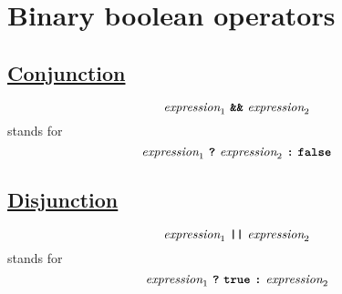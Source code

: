 \section*{Binary boolean operators}

\subsection*{\href{https://sicp.comp.nus.edu.sg/chapters/8}{Conjunction}}

\[
\textit{expression}_1 \ \textbf{\texttt{\&\&}} \ \textit{expression}_2
\]
stands for
\[
\textit{expression}_1 \ \textbf{\texttt{?}} \ \textit{expression}_2 \ \textbf{\texttt{:}}\ \textbf{\texttt{false}}
\]

\subsection*{\href{https://sicp.comp.nus.edu.sg/chapters/8}{Disjunction}}

\[
\textit{expression}_1 \ \textbf{\texttt{||}} \ \textit{expression}_2
\]
stands for
\[
\textit{expression}_1 \ \textbf{\texttt{?}}\ \textbf{\texttt{true}}\  \textbf{\texttt{:}}\ \textit{expression}_2
\]



